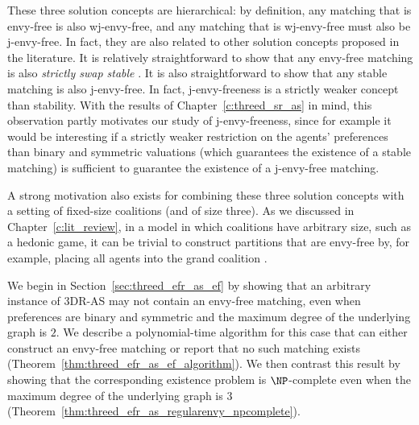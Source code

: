 These three solution concepts are hierarchical: by definition, any matching that is envy-free is also wj-envy-free, and any matching that is wj-envy-free must also be j-envy-free. In fact, they are also related to other solution concepts proposed in the literature. It is relatively straightforward to show that any envy-free matching is also \emph{strictly swap stable} \cite{Bilo22}. It is also straightforward to show that any stable matching is also j-envy-free. In fact, j-envy-freeness is a strictly weaker concept than stability. With the results of Chapter~\ref{c:threed_sr_as} in mind, this observation partly motivates our study of j-envy-freeness, since for example it would be interesting if a strictly weaker restriction on the agents' preferences than binary and symmetric valuations (which guarantees the existence of a stable matching) is sufficient to guarantee the existence of a j-envy-free matching.


A strong motivation also exists for combining these three solution concepts with a setting of fixed-size coalitions (and of size three). As we discussed in Chapter~\ref{c:lit_review}, in a model in which coalitions have arbitrary size, such as a hedonic game, it can be trivial to construct partitions that are envy-free by, for example, placing all agents into the grand coalition \cite{BY19,Ued18}.

We begin in Section~\ref{sec:threed_efr_as_ef} by showing that an arbitrary instance of 3DR-AS may not contain an envy-free matching, even when preferences are binary and symmetric and the maximum degree of the underlying graph is $2$. We describe a polynomial-time algorithm for this case that can either construct an envy-free matching or report that no such matching exists (Theorem~\ref{thm:threed_efr_as_ef_algorithm}). We then contrast this result by showing that the corresponding existence problem is $\NP$-complete even when the maximum degree of the underlying graph is $3$ (Theorem~\ref{thm:threed_efr_as_regularenvy_npcomplete}).


